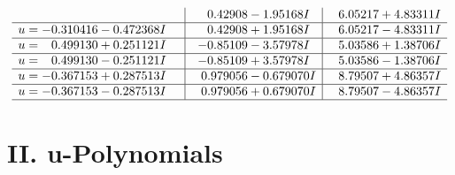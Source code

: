 \documentclass[1p]{elsarticle_modified}
\theoremstyle{definition}
\begin{document}
$$\begin{array}{c|c|c}
 & \phantom{-}0.42908 - 1.95168 I & \phantom{-}6.05217 + 4.83311 I \\ \hline\begin{aligned}
u &= -0.310416 - 0.472368 I\end{aligned}
 & \phantom{-}0.42908 + 1.95168 I & \phantom{-}6.05217 - 4.83311 I \\ \hline\begin{aligned}
u &= \phantom{-}0.499130 + 0.251121 I\end{aligned}
 & -0.85109 - 3.57978 I & \phantom{-}5.03586 + 1.38706 I \\ \hline\begin{aligned}
u &= \phantom{-}0.499130 - 0.251121 I\end{aligned}
 & -0.85109 + 3.57978 I & \phantom{-}5.03586 - 1.38706 I \\ \hline\begin{aligned}
u &= -0.367153 + 0.287513 I\end{aligned}
 & \phantom{-}0.979056 - 0.679070 I & \phantom{-}8.79507 + 4.86357 I \\ \hline\begin{aligned}
u &= -0.367153 - 0.287513 I\end{aligned}
 & \phantom{-}0.979056 + 0.679070 I & \phantom{-}8.79507 - 4.86357 I\\
 \hline 
 \end{array}$$\newpage
\newpage\renewcommand{\arraystretch}{1}
\centering \section*{ II. u-Polynomials}
\end{document}
